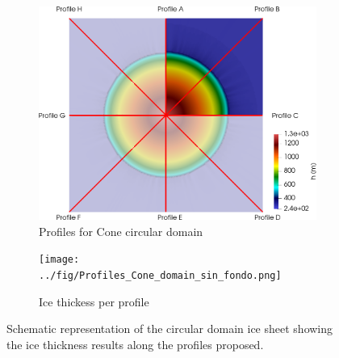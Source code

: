 \documentclass{article}
\begin{document}
\begin{figure}
	\centering
	\begin{subfigure}{.5\textwidth}
		\centering
		\includegraphics[width=0.99\linewidth]{../fig/Profiles_Cone_combined_domains.png}
		\caption{Profiles for Cone circular domain}
		\label{Schematic_Cone}
	\end{subfigure}%
	\begin{subfigure}{.5\textwidth}
		\centering
		\texttt{[image: ../fig/Profiles\_Cone\_domain\_sin\_fondo.png]}
		\caption{Ice thickess per profile}
		\label{Profiles_cone}
	\end{subfigure}
	\caption{Schematic representation of the circular domain ice sheet showing the ice thickness results along the profiles proposed.}
	\label{Cone_scheme}
\end{figure}
\end{document}
